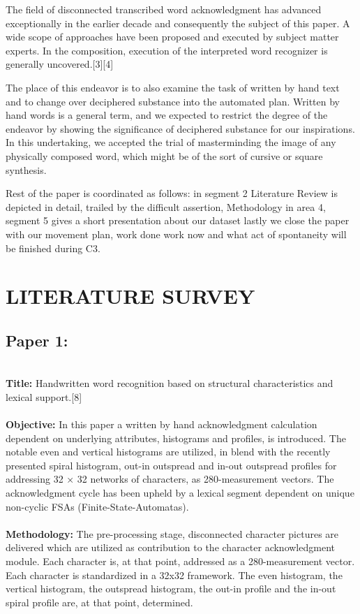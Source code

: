\documentclass[12pt, conference]{IEEEtran}
\begin{document}
The field of disconnected transcribed word acknowledgment has advanced exceptionally in the earlier decade and consequently the subject of this paper. A wide scope of approaches have been proposed and executed by subject matter experts. In the composition, execution of the interpreted word recognizer is generally uncovered.[3][4]

The place of this endeavor is to also examine the task of written by hand text and to change over deciphered substance into the automated plan. Written by hand words is a general term, and we expected to restrict the degree of the endeavor by showing the significance of deciphered substance for our inspirations. In this undertaking, we accepted the trial of masterminding the image of any physically composed word, which might be of the sort of cursive or square synthesis.

Rest of the paper is coordinated as follows: in segment 2 Literature Review is depicted in detail, trailed by the difficult assertion, Methodology in area 4, segment 5 gives a short presentation about our dataset lastly we close the paper with our movement plan, work done work now and what act of spontaneity will be finished during C3. \\

\section{\textbf{LITERATURE SURVEY}}
\textbf{}
\subsection{\textbf{Paper 1:}}
\textbf{}\\
\textbf{Title:} Handwritten word recognition based on structural characteristics and lexical support.[8]\\
\textbf{}\\
\textbf{Objective:} In this paper a written by hand acknowledgment calculation dependent on underlying attributes, histograms and profiles, is introduced. The notable even and vertical histograms are utilized, in blend with the recently presented spiral histogram, out-in outspread and in-out outspread profiles for addressing 32 × 32 networks of characters, as 280-measurement vectors. The acknowledgment cycle has been upheld by a lexical segment dependent on unique non-cyclic FSAs (Finite-State-Automatas).\\
\textbf{}\\
\textbf{Methodology:} The pre-processing stage, disconnected character pictures are delivered which are utilized as contribution to the character acknowledgment module. Each character is, at that point, addressed as a 280-measurement vector. Each character is standardized in a 32x32 framework. The even histogram, the vertical histogram, the outspread histogram, the out-in profile and the in-out spiral profile are, at that point, determined.
\end{document}
